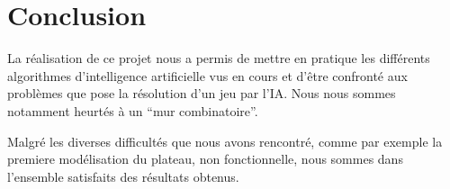 \documentclass{article}
\begin{document}
\section{Conclusion}

La réalisation de ce projet nous a permis de mettre en pratique les différents
 algorithmes d'intelligence artificielle vus en cours et d'être confronté aux
 problèmes que pose la résolution d'un jeu par l'IA. Nous nous sommes notamment heurtés 
à un ``mur combinatoire''.

Malgré les diverses difficultés que nous avons rencontré, comme par exemple
la premiere modélisation du plateau, non fonctionnelle, 
nous sommes dans l'ensemble satisfaits des résultats obtenus.
\end{document}
